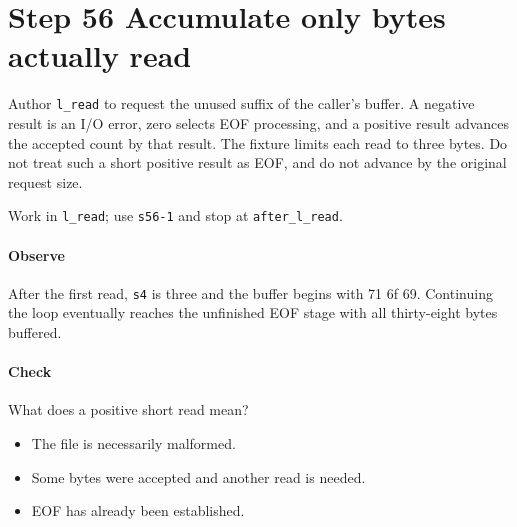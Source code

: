 \section{Step 56 Accumulate only bytes actually read}\label{qoi-s56}
Author \texttt{l\_read} to request the unused suffix of the caller’s buffer. A negative result is an I/O error, zero selects EOF processing, and a positive result advances the accepted count by that result. The fixture limits each read to three bytes. Do not treat such a short positive result as EOF, and do not advance by the original request size.

Work in \texttt{l\_read}; use \texttt{s56-1} and stop at \texttt{after\_l\_read}.

\paragraph{Observe} After the first read, \texttt{s4} is three and the buffer begins with 71 6f 69. Continuing the loop eventually reaches the unfinished EOF stage with all thirty-eight bytes buffered.

\paragraph{Check} What does a positive short read mean?
\begin{itemize}
  \item[A.] The file is necessarily malformed.
  \item[B.] Some bytes were accepted and another read is needed.
  \item[C.] EOF has already been established.
\end{itemize}
